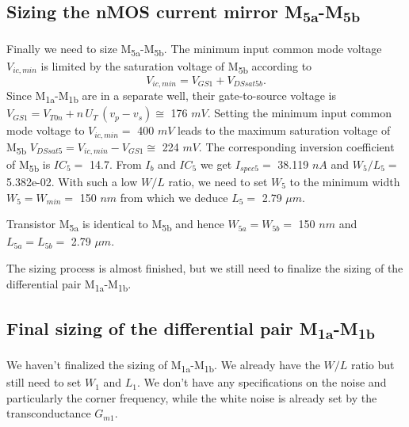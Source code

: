 \documentclass[
  a4paper,
  DIV=11,
  numbers=noendperiod]{scrreprt}
\begin{document}
\subsection{\texorpdfstring{Sizing the nMOS current mirror
M\textsubscript{5a}-M\textsubscript{5b}}{Sizing the nMOS current mirror M5a-M5b}}\label{sizing-the-nmos-current-mirror-m5a-m5b}

Finally we need to size M\textsubscript{5a}-M\textsubscript{5b}. The
minimum input common mode voltage \(V_{ic,min}\) is limited by the
saturation voltage of M\textsubscript{5b} according to \begin{equation}
  V_{ic,min} = V_{GS1} + V_{DSsat5b}.
\end{equation} Since M\textsubscript{1a}-M\textsubscript{1b} are in a
separate well, their gate-to-source voltage is
\(V_{GS1} = V_{T0n} + n\,U_T\,(v_p-v_s) \cong\) 176 \(mV\). Setting the
minimum input common mode voltage to \(V_{ic,min} =\) 400 \(mV\) leads
to the maximum saturation voltage of M\textsubscript{5b}
\(V_{DSsat5} = V_{ic,min} - V_{GS1} \cong\) 224 \(mV\). The
corresponding inversion coefficient of M\textsubscript{5b} is \(IC_5 =\)
14.7. From \(I_b\) and \(IC_5\) we get \(I_{spec5} =\) 38.119 \(nA\) and
\(W_5/L_5 =\) 5.382e-02. With such a low \(W/L\) ratio, we need to set
\(W_5\) to the minimum width \(W_5 = W_{min} =\) 150 \(nm\) from which
we deduce \(L_5 =\) 2.79 \(\mu m\).

Transistor M\textsubscript{5a} is identical to M\textsubscript{5b} and
hence \(W_{5a} = W_{5b} =\) 150 \(nm\) and \(L_{5a} = L_{5b} =\) 2.79
\(\mu m\).

The sizing process is almost finished, but we still need to finalize the
sizing of the differential pair M\textsubscript{1a}-M\textsubscript{1b}.

\subsection{\texorpdfstring{Final sizing of the differential pair
M\textsubscript{1a}-M\textsubscript{1b}}{Final sizing of the differential pair M1a-M1b}}\label{final-sizing-of-the-differential-pair-m1a-m1b}

We haven't finalized the sizing of
M\textsubscript{1a}-M\textsubscript{1b}. We already have the \(W/L\)
ratio but still need to set \(W_1\) and \(L_1\). We don't have any
specifications on the noise and particularly the corner frequency, while
the white noise is already set by the transconductance \(G_{m1}\).
\end{document}
